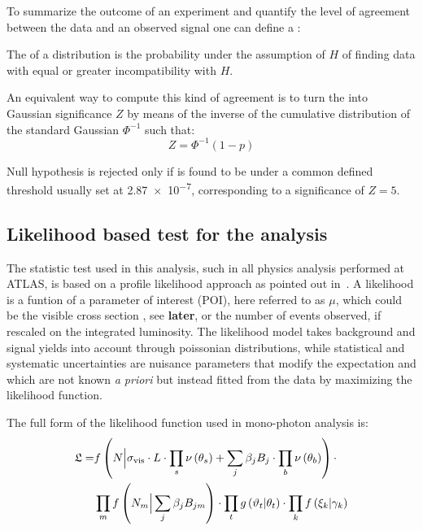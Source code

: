 To summarize the outcome of an experiment and quantify the level of agreement between the data and an observed signal one can define a \p:
\begin{definizione}
  The \p of a distribution is the probability under the assumption of $H$ of finding data with equal or greater incompatibility with $H$.
\end{definizione}

An equivalent way to compute this kind of agreement is to turn the \p into Gaussian significance $Z$ by means of the inverse of the cumulative distribution of the standard Gaussian $\Phi^{-1}$ such that:
\begin{equation}
  Z = \Phi^{-1}(1-p)
\end{equation}

Null hypothesis is rejected only if \p is found to be under a common defined threshold usually set at \num{2.87e-7}, corresponding to a significance of $Z=5$.

\subsection{Likelihood based test for the \mph analysis}
The statistic test used in this analysis, such in all physics analysis performed at ATLAS, is based on a profile likelihood approach as pointed out in~\cite{mgiulia}. A likelihood is a funtion of a parameter of interest (POI), here referred to as $\mu$, which could be the visible cross section \sv, see \textbf{later}, or the number of events observed, if rescaled on the integrated luminosity.
The likelihood model takes background and signal yields into account through poissonian distributions, while statistical and systematic uncertainties are nuisance parameters that modify the expectation and which are not known {\itshape a priori} but instead fitted from the data by maximizing the likelihood function.

The full form of the likelihood function used in mono-photon analysis is: 
\begin{equation}
  \label{eqn:likelihood}
  \begin{split}
    \mathfrak{L} = &  f\left( N \Big\vert \sigma_{\textup{vis}} \cdot L \cdot \prod_s \nu\left(\theta_{s}\right) +\sum _j \beta_{j} B_{j}\cdot \prod_b \nu\left(\theta_{b}\right)\right) \cdot \\
    & \prod_m f\left(N_{m} \Big\vert \sum _j \beta_{j} B_{jm}\right) \cdot \prod _t g\left(\vartheta_{t} \vert \theta_{t}\right) \cdot \prod _k f\left(\xi_{k} \vert \gamma_{k}\right)
  \end{split}
\end{equation}

